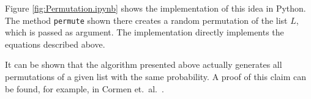 Figure \ref{fig:Permutation.ipynb} shows the implementation of this idea in Python. The method \texttt{permute} shown
there creates a random permutation of the list $L$, which is passed as argument. The implementation directly
implements the equations described above. 

It can be shown that the algorithm presented above actually generates all permutations of a given list with the
same probability. A proof of this claim can be found, for example, in 
Cormen et.~al.~\cite{cormen:01}.



